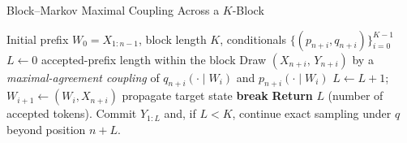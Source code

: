 \begin{algorithm}[t]
\caption{Block--Markov Maximal Coupling Across a $K$-Block}
\label{alg:block-markov-max-coupling}
\begin{algorithmic}[1]
\Require Initial prefix $W_0=X_{1:n-1}$, block length $K$, conditionals $\{(p_{n+i},q_{n+i})\}_{i=0}^{K-1}$
\State $L\gets 0$ \Comment accepted-prefix length within the block
  \State Draw $(X_{n+i},\,Y_{n+i})$ by a \emph{maximal-agreement coupling} of $q_{n+i}(\cdot\mid W_i)$ and $p_{n+i}(\cdot\mid W_i)$
     \State $L\gets L+1$; \hspace{0.5em} $W_{i+1}\gets (W_i, X_{n+i})$ \Comment propagate target state
  \Else
     \State \textbf{break}
  \EndIf
\EndFor
\State \textbf{Return} $L$ (number of accepted tokens). Commit $Y_{1:L}$ and, if $L<K$, continue exact sampling under $q$ beyond position $n+L$.
\end{algorithmic}
\end{algorithm}

